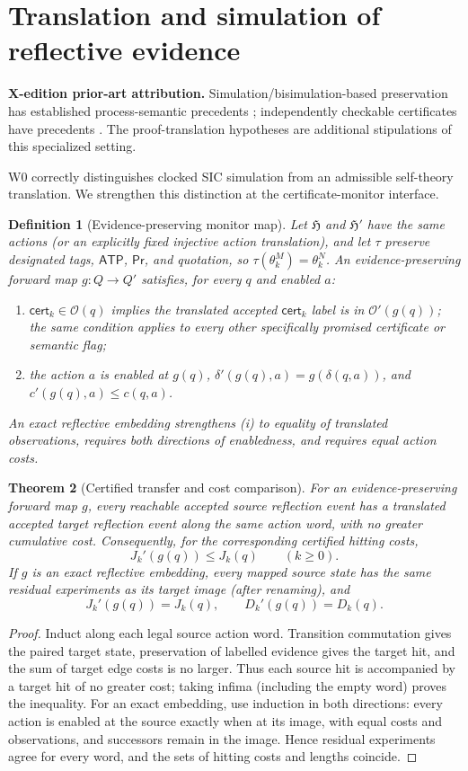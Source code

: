 \documentclass[11pt,letterpaper]{article}
\newcommand{\PriorArtNote}[1]{%
\par\smallskip\noindent\begin{minipage}{\linewidth}\small\color{black!85}%
\textbf{X-edition prior-art attribution.} #1\end{minipage}\par\smallskip}
\newtheorem{theorem}{Theorem}[section]
\newtheorem{definition}[theorem]{Definition}
\newcommand{\Cert}{\mathsf{cert}}
\newcommand{\Prv}{\mathsf{Pr}}
\newcommand{\ATP}{\mathsf{ATP}}
\newcommand{\Ob}{\mathcal{O}}
\begin{document}
\section{Translation and simulation of reflective evidence}
\PriorArtNote{Simulation/bisimulation-based preservation has established process-semantic precedents \cite{milner}; independently checkable certificates have precedents \cite{necula}. The proof-translation hypotheses are additional stipulations of this specialized setting.}
W0 correctly distinguishes clocked SIC simulation from an admissible self-theory translation. We strengthen this distinction at the certificate-monitor interface.
\begin{definition}[Evidence-preserving monitor map]\label{def:emap}
Let $\mathfrak H$ and $\mathfrak H'$ have the same actions (or an explicitly fixed injective action translation), and let $\tau$ preserve designated tags, $\ATP$, $\Prv$, and quotation, so $\tau(\theta_k^M)=\theta_k^N$. An \emph{evidence-preserving forward map} $g:Q\to Q'$ satisfies, for every $q$ and enabled $a$:
\begin{enumerate}[label=(\roman*),leftmargin=*]
\item $\Cert_k\in\Ob(q)$ implies the translated accepted $\Cert_k$ label is in $\Ob'(g(q))$; the same condition applies to every other specifically promised certificate or semantic flag;
\item the action $a$ is enabled at $g(q)$, $\delta'(g(q),a)=g(\delta(q,a))$, and $c'(g(q),a)\le c(q,a)$.
\end{enumerate}
An \emph{exact reflective embedding} strengthens (i) to equality of translated observations, requires both directions of enabledness, and requires equal action costs.
\end{definition}
\begin{theorem}[Certified transfer and cost comparison]\label{thm:transfer}
For an evidence-preserving forward map $g$, every reachable accepted source reflection event has a translated accepted target reflection event along the same action word, with no greater cumulative cost. Consequently, for the corresponding certified hitting costs,
\[
 J_k'(g(q))\le J_k(q)\qquad(k\ge0).
\]
If $g$ is an exact reflective embedding, every mapped source state has the same residual experiments as its target image (after renaming), and
\[
 J_k'(g(q))=J_k(q),\qquad D_k'(g(q))=D_k(q).
\]
\end{theorem}
\begin{proof}
Induct along each legal source action word. Transition commutation gives the paired target state, preservation of labelled evidence gives the target hit, and the sum of target edge costs is no larger. Thus each source hit is accompanied by a target hit of no greater cost; taking infima (including the empty word) proves the inequality. For an exact embedding, use induction in both directions: every action is enabled at the source exactly when at its image, with equal costs and observations, and successors remain in the image. Hence residual experiments agree for every word, and the sets of hitting costs and lengths coincide.
\end{proof}
\end{document}
